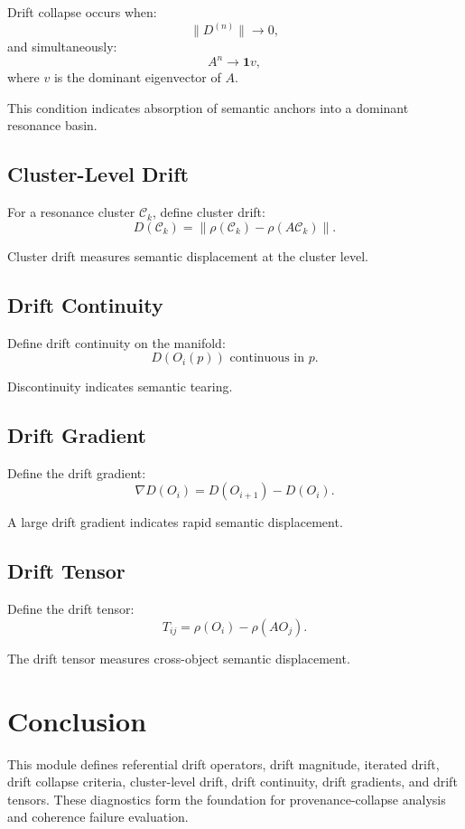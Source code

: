 Drift collapse occurs when:
\[
\|D^{(n)}\| \to 0,
\]
and simultaneously:
\[
A^n \to \mathbf{1} v,
\]
where $v$ is the dominant eigenvector of $A$.

This condition indicates absorption of semantic anchors into a dominant
resonance basin.

\subsection{Cluster-Level Drift}

For a resonance cluster $\mathcal{C}_k$, define cluster drift:
\[
D(\mathcal{C}_k)
  = \left\| \rho(\mathcal{C}_k) - \rho(A \mathcal{C}_k) \right\|.
\]

Cluster drift measures semantic displacement at the cluster level.

\subsection{Drift Continuity}

Define drift continuity on the manifold:
\[
D(O_i(p)) \text{ continuous in } p.
\]

Discontinuity indicates semantic tearing.

\subsection{Drift Gradient}

Define the drift gradient:
\[
\nabla D(O_i) = D(O_{i+1}) - D(O_i).
\]

A large drift gradient indicates rapid semantic displacement.

\subsection{Drift Tensor}

Define the drift tensor:
\[
T_{ij} = \rho(O_i) - \rho(A O_j).
\]

The drift tensor measures cross-object semantic displacement.

\section{Conclusion}

This module defines referential drift operators, drift magnitude,
iterated drift, drift collapse criteria, cluster-level drift, drift
continuity, drift gradients, and drift tensors. These diagnostics form
the foundation for provenance-collapse analysis and coherence failure
evaluation.
